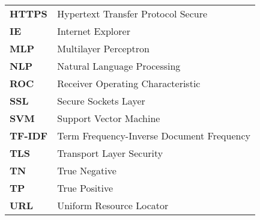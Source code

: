 \begin{singlespace}
\begin{table}[!h]
\begin{tabular}{  m{10em}  m{22em}  }
			\textbf{HTTPS}  & Hypertext Transfer Protocol Secure        \\\addlinespace

			\textbf{IE}     & Internet Explorer                         \\\addlinespace

			\textbf{MLP}    & Multilayer Perceptron                     \\\addlinespace

			\textbf{NLP}    & Natural Language Processing               \\\addlinespace

			\textbf{ROC}    & Receiver Operating Characteristic         \\\addlinespace

			\textbf{SSL}    & Secure Sockets Layer                      \\\addlinespace

			\textbf{SVM}    & Support Vector Machine                    \\\addlinespace

			\textbf{TF-IDF} & Term Frequency-Inverse Document Frequency \\\addlinespace

			\textbf{TLS}    & Transport Layer Security                  \\\addlinespace

			\textbf{TN}     & True Negative                             \\\addlinespace

			\textbf{TP}     & True Positive                             \\\addlinespace

			\textbf{URL}    & Uniform Resource Locator                  \\
		\end{tabular}
	\end{table}
\end{singlespace}
